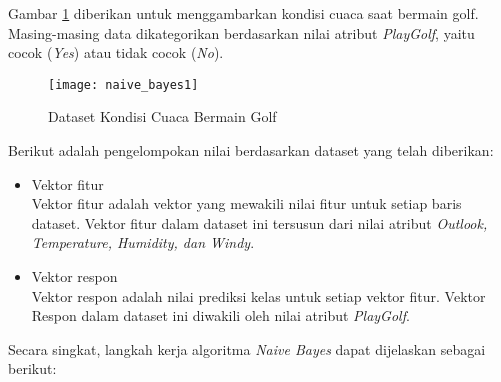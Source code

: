\vspace{0.3cm}

\noindent Gambar \ref{fig:naive_bayes1} diberikan untuk menggambarkan kondisi cuaca saat bermain golf. Masing-masing data dikategorikan berdasarkan nilai atribut \textit{PlayGolf}, yaitu cocok (\textit{Yes}) atau tidak cocok (\textit{No}). 

\begin{figure}[H]
	\centering
	\texttt{[image: naive\_bayes1]}
	\caption{Dataset Kondisi Cuaca Bermain Golf}
	\label{fig:naive_bayes1}
\end{figure}

\noindent Berikut adalah pengelompokan nilai berdasarkan dataset yang telah diberikan:

\begin{itemize}

\item 
Vektor fitur\\
Vektor fitur adalah vektor yang mewakili nilai fitur untuk setiap baris dataset. Vektor fitur dalam dataset ini tersusun dari nilai atribut \textit{Outlook, Temperature, Humidity, dan Windy}.

\item
Vektor respon\\
Vektor respon adalah nilai prediksi kelas untuk setiap vektor fitur. Vektor Respon dalam dataset ini diwakili oleh nilai atribut \textit{PlayGolf}.

\end{itemize}


\noindent Secara singkat, langkah kerja algoritma \textit{Naive Bayes} dapat dijelaskan sebagai berikut:

